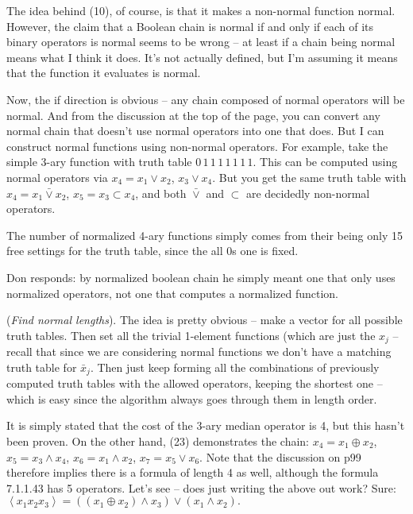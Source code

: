 \vskip 0.05in  The idea behind (10),
of course, is that it makes a non-normal function normal.  However, the claim
that a Boolean chain is normal if and only if each of its binary operators is
normal seems to be wrong -- at least if a chain being normal means what
I think it does.  It's not actually defined, but I'm assuming it means that the
function it evaluates is normal.  

Now, the if direction is obvious -- any chain composed of normal operators
will be normal.  And from the discussion at the top of the page, you can convert
any normal chain that doesn't use normal operators into one that does.
But I can construct normal functions using non-normal operators.
For example, take the simple 3-ary function with truth table
$0\,1\,1\,1\,1\,1\,1\,1$.  This can be computed using normal
operators via $x_4 = x_1 \lor x_2$, $x_3 \lor x_4$.  But you get
the same truth table with $x_4 = x_1 \bar \lor x_2$, $x_5 = x_3 \subset x_4$,
and both $\bar \lor$ and $\subset$ are decidedly non-normal operators.

The number of normalized 4-ary functions simply comes from their being
only 15 free settings for the truth table, since the all 0s one is fixed.

Don responds: by normalized boolean chain he simply meant one
that only uses normalized operators, not one that computes a normalized
function.

\vskip 0.05in  ({\it Find normal lengths}).\hfil\break
The idea is pretty obvious -- make a vector for all possible truth tables.
Then set all the trivial 1-element functions (which are just the $x_j$ --
recall that since we are considering normal functions we don't have
a matching truth table for $\bar x_j$.  Then just keep forming all the
combinations of previously computed truth tables with the allowed operators,
keeping the shortest one -- which is easy since the algorithm always goes
through them in length order.

\vskip 0.1in 

\noindent [p 107] It is simply stated that the cost of the 3-ary median
operator is 4, but this hasn't been proven.  On the other hand, (23)
demonstrates the chain: $x_4 = x_1 \oplus x_2$, $x_5 = x_3 \land x_4$,
$x_6 = x_1 \land x_2$, $x_7 = x_5 \lor x_6$.  Note that the discussion
on p99 therefore implies there is a formula of length 4 as well, although
the formula 7.1.1.43 has 5 operators.  Let's see -- does just writing
the above out work?  Sure:
$
\left< x_1 x_2 x_3 \right> = \left(\left(x_1 \oplus x_2\right) \land x_3\right)
\lor \left(x_1 \land x_2\right).
$

